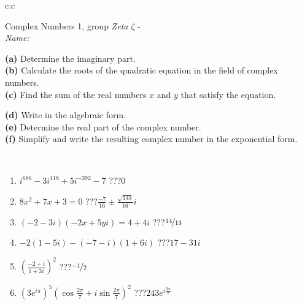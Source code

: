 \documentclass[10pt]{report}
\begin{document}
\begin{tabular}{c:c}
\begin{minipage}[c][104.5mm][t]{0.5\linewidth}
\begin{center}
{\huge Complex Numbers 1, group \textit{Zeta $\zeta$} -}\\[5mm]
\textit{Name:}\phantom{xxxxxxxxxxxxxxxxxxxxxxxxxxxxxxxxxxxxxxxxxxxxxxxxxxxxxxxxxxxxxxxxx}\\[5mm]
\begin{minipage}{0.95\linewidth}
\begin{center}
{\small \begin{minipage}{0.44\textwidth} \raggedright
\textbf{(a)} Determine the imaginary part. \\[1mm]
\textbf{(b)} Calculate the roots of the quadratic equation in the field of complex numbers. \\[1mm]
\textbf{(c)} Find the sum of the real numbers \(x\) and \(y\) that satisfy the equation. \end{minipage} \begin{minipage}{0.54\textwidth}
\textbf{(d)} Write in the algebraic form. \\[1mm]
\textbf{(e)} Determine the real part of the complex number. \\[1mm]
\textbf{(f)} Simplify and write the resulting complex number in the exponential form.
\end{minipage}
} \vspace{3mm}
\end{center}
\end{minipage}
\\[1mm]
\begin{minipage}{0.79\linewidth}
\begin{center}
\begin{varwidth}{\linewidth}
\setlength{\itemsep}{0pt}
\begin{enumerate}
\large
\item $i^{686}-3i^{118}+5i^{-392}-7$\quad \dotfill\; ???\;\dotfill \quad $0$
\item $8x^2+7x+3=0$\quad \dotfill\; ???\;\dotfill \quad $\frac{-7}{16} \pm{}\frac{ \sqrt{143}}{16}i$
\item $(-2-3i)(-2x+5yi)=4+4i$\quad \dotfill\; ???\;\dotfill \quad $\nicefrac{14}{13}$
\item $-2(1-5i)-(-7-i)\overline{(1+6i)}$\quad \dotfill\; ???\;\dotfill \quad $17-31i$
\item $\left(\frac{-2+i}{1+3i}\right)^2$\quad \dotfill\; ???\;\dotfill \quad $\nicefrac{-1}{2}$
\item $\left(3e^{i\pi}\right)^{5}\left(\cos{\frac{2\pi}{7}}+i\sin{\frac{2\pi}{7}}\right)^{2}$\quad \dotfill\; ???\;\dotfill \quad $243e^{i\frac{3\pi}{7}}$

\end{enumerate}
\end{varwidth}
\end{center}
\end{minipage}
\end{center}
\end{minipage}
\end{tabular}
\end{document}

